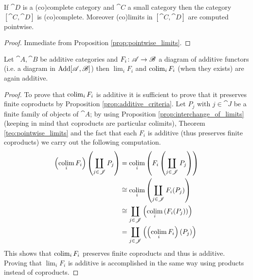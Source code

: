 \begin{theorem}
  \label{teo:pointwise_limits}
  If \(\cat{D}\) is a (co)complete category and \(\cat{C}\) a small category then the category \([\cat{C},\cat{D}]\) is (co)complete. Moreover (co)limits in \([\cat{C}, \cat{D}]\) are computed pointwise.
\end{theorem}

\begin{proof}
  Immediate from Proposition \ref{prop:pointwise_limits}.
\end{proof}

\begin{proposition}
  \label{prop:limits_of_additive_functors}
  Let \(\cat{A},\cat{B}\) be additive categories and \(F_i\colon {\mathscr A}\to {\mathscr B}\) a diagram of additive functors (i.e. a diagram in \(\text{\normalfont Add}[{\mathscr A}, {\mathscr B}]\)) then \(\lim_iF_i\) and \(\operatorname*{colim}_iF_i\) (when they exists) are again additive.
\end{proposition}

\begin{proof}
  To prove that \(\operatorname*{colim}_iF_i\) is additive it is sufficient to prove that it preserves finite coproducts by Proposition \ref{prop:additive_criteria}. Let \(P_j\) with \(j\in\cat{J}\) be a finite family of objects of \(\cat{A}\); by using Proposition \ref{prop:interchange_of_limits} (keeping in mind that coproducts are particular colimits), Theorem \ref{teo:pointwise_limits} and the fact that each \(F_i\) is additive (thus preserves finite coproducts) we carry out the following computation.
  \begin{align*}
    \left(\operatorname*{colim}_iF_i\right)\left(\coprod_{j\in{\mathscr J}}P_j\right) &= \operatorname*{colim}_i\left(F_i\left(\coprod_{j\in{\mathscr J}}P_j\right)\right)\\
                                                                  &\cong\operatorname*{colim}_i\left(\coprod_{j\in{\mathscr J}}F_i(P_j)\right)\\
                                                                  &\cong\coprod_{j\in{\mathscr J}}\left(\operatorname*{colim}_i\left(F_i(P_j)\right)\right)\\
                                                                  &=\coprod_{j\in{\mathscr J}}\left(\left(\operatorname*{colim}_iF_i\right)(P_j)\right)
  \end{align*}
  This shows that \(\operatorname*{colim}_iF_i\) preserves finite coproducts and thus is additive. Proving that \(\lim_iF_i\) is additive is accomplished in the same way using products instead of coproducts.
\end{proof}

